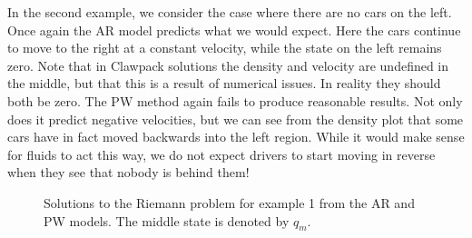 \documentclass{article}
\begin{document}
In the second example, we consider the case where there are no cars on the left.  Once again the AR model predicts what we would expect.  Here the cars continue to move to the right at a constant velocity, while the state on the left remains zero.  Note that in Clawpack solutions the density and velocity are undefined in the middle, but that this is a result of numerical issues.  In reality they should both be zero.  The PW method again fails to produce reasonable results.  Not only does it predict negative velocities, but we can see from the density plot that some cars have in fact moved backwards into the left region.  While it would make sense for fluids to act this way, we do not expect drivers to start moving in reverse when they see that nobody is behind them!

\begin{figure}[H]
 \centering
 \caption[Optional caption for list of figures]
 {Solutions to the Riemann problem for example 1 from the AR and PW models. The middle state is denoted by $q_m$.}
  \label{fig:example1}
\end{figure}
\end{document}
